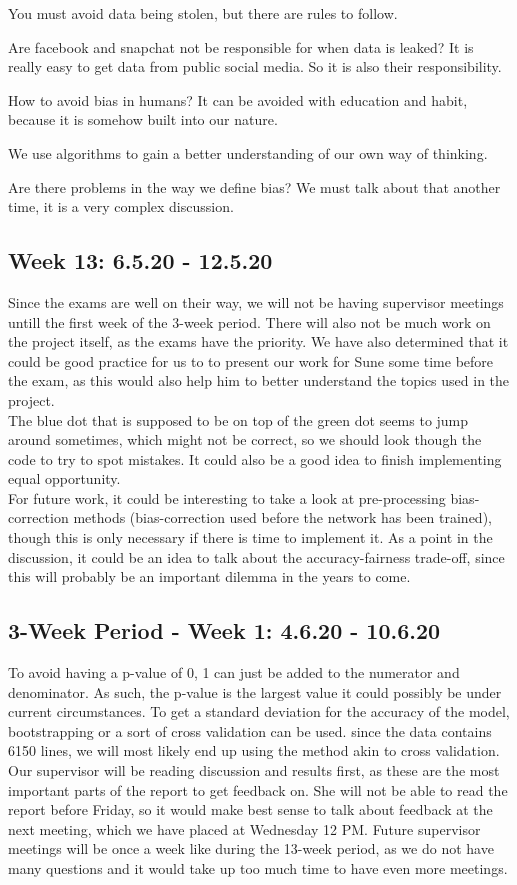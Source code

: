 \documentclass[11pt, fleqn]{article}
\begin{document}
You must avoid data being stolen, but there are rules to follow.

Are facebook and snapchat not be responsible for when data is leaked?
It is really easy to get data from public social media. So it is also their responsibility.

How to avoid bias in humans?
It can be avoided with education and habit, because it is somehow built into our nature.

We use algorithms to gain a better understanding of our own way of thinking.

Are there problems in the way we define bias?
We must talk about that another time, it is a very complex discussion.

\subsection*{Week 13: 6.5.20 - 12.5.20}
Since the exams are well on their way, we will not be having supervisor meetings untill the first week of the 3-week period. There will also not be much work on the project itself, as the exams have the priority. We have also determined that it could be good practice for us to to present our work for Sune some time before the exam, as this would also help him to better understand the topics used in the project. \\
The blue dot that is supposed to be on top of the green dot seems to jump around sometimes, which might not be correct, so we should look though the code to try to spot mistakes. It could also be a good idea to finish implementing equal opportunity. \\
For future work, it could be interesting to take a look at pre-processing bias-correction methods (bias-correction used before the network has been trained), though this is only necessary if there is time to implement it. As a point in the discussion, it could be an idea to talk about the accuracy-fairness trade-off, since this will probably be an important dilemma in the years to come.

\subsection*{3-Week Period - Week 1: 4.6.20 - 10.6.20}
To avoid having a p-value of 0, 1 can just be added to the numerator and denominator. As such, the p-value is the largest value it could possibly be under current circumstances. To get a standard deviation for the accuracy of the model, bootstrapping or a sort of cross validation can be used. since the data contains 6150 lines, we will most likely end up using the method akin to cross validation.
Our supervisor will be reading discussion and results first, as these are the most important parts of the report to get feedback on. She will not be able to read the report before Friday, so it would make best sense to talk about feedback at the next meeting, which we have placed at Wednesday 12 PM.
Future supervisor meetings will be once a week like during the 13-week period, as we do not have many questions and it would take up too much time to have even more meetings.
\end{document}
